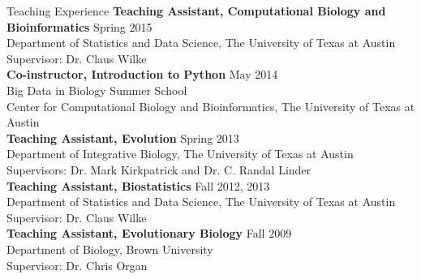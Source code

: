 \documentclass{resume} %
\begin{document}
\begin{rSection}{Teaching Experience}
\textbf{Teaching Assistant, Computational Biology and Bioinformatics} \hfill Spring 2015 \\ Department of Statistics and Data Science, The University of Texas at Austin \\
Supervisor: Dr. Claus Wilke \\

\textbf{Co-instructor, Introduction to Python} \hfill May 2014 \\ Big Data in Biology Summer School \\ Center for Computational Biology and Bioinformatics, The University of Texas at Austin \\

\textbf{Teaching Assistant, Evolution} \hfill Spring 2013 \\ Department of Integrative Biology, The University of Texas at Austin \\
Supervisors: Dr. Mark Kirkpatrick and Dr. C. Randal Linder \\

\textbf{Teaching Assistant, Biostatistics} \hfill Fall 2012, 2013 \\ Department of Statistics and Data Science, The University of Texas at Austin \\
Supervisor: Dr. Claus Wilke \\

\textbf{Teaching Assistant, Evolutionary Biology} \hfill Fall 2009  \\ Department of Biology, Brown University \\
Supervisor: Dr. Chris Organ

\end{rSection}
\vspace*{0.5cm}
\end{document}
